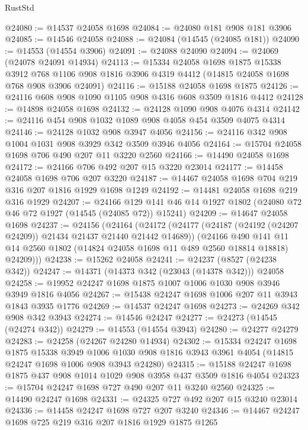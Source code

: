 \begin{lexlean}{RustStd}
\begin{coremodule}
@24080 := @14537 @24058 @1698
@24084 := @24080 @181 @908 @181 @3906
@24085 := @14546 @24058
@24088 := @24084 (@14545 (@24085 @181))
@24090 := @14553 (@14554 @3906)
@24091 := @24088 @24090
@24094 := @24069 (@24078 @24091 @14934)
@24113 := @15334
    @24058
    @1698
    @1875
    @15338
    @3912
    @768
    @1106
    @908
    @1816
    @3906
    @4319
    @4412
    (@14815 @24058 @1698 @768 @908 @3906 @24091)
@24116 := @15188 @24058 @1698 @1875
@24126 := @24116 @608 @908 @1090 @1105 @908 @4316 @608 @3509 @1816 @4412
@24128 := @14898 @24058 @1698
@24132 := @24128 @1090 @908 @4076 @4314
@24142 := @24116 @454 @908 @1032 @1089 @908 @4058 @454 @3509 @4075 @4314
@24146 := @24128 @1032 @908 @3947 @4056
@24156 := @24116 @342 @908 @1004 @1031 @908 @3929 @342 @3509 @3946 @4056
@24164 := @15704 @24058 @1698 @706 @490 @207 @11 @3220 @2560
@24166 := @14490 @24058 @1698
@24172 := @24166 @706 @492 @207 @15 @3220 @23014
@24177 := @14458 @24058 @1698 @706 @207 @3220
@24187 := @14467 @24058 @1698 @704 @219 @316 @207 @1816 @1929 @1698 @1249
@24192 := @14481 @24058 @1698 @219 @316 @1929
@24207 := @24166
    @129
    @141
    @46
    @14
    @1927
    @1802
    (@24080 @72 @46 @72 @1927 (@14545 (@24085 @72)) @15241)
@24209 := @14647 @24058 @1698
@24237 := @24156
    (@24164
      (@24172
        (@24177 (@24187 (@24192 (@24207 @24209)) @21434 @21437 @21440 @21442 @14689))
        (@24166
          @490
          @141
          @11
          @14
          @2560
          @1802
          (@14824 @24058 @1698 @11 @489 @2560 @18814 @18818)
          @24209)))
@24238 := @15262 @24058
@24241 := @24237 (@8527 (@24238 @342))
@24247 := @14371 (@14373 @342 (@23043 (@14378 @342))) @24058
@24258 := @19952 @24247 @1698 @1875 @1007 @1006 @1030 @908 @3946 @3949 @1816 @4056
@24267 := @15438 @24247 @1698 @1006 @207 @11 @3943 @1843 @3935 @1776
@24269 := @14537 @24247 @1698
@24273 := @24269 @342 @908 @342 @3943
@24274 := @14546 @24247
@24277 := @24273 (@14545 (@24274 @342))
@24279 := @14553 (@14554 @3943)
@24280 := @24277 @24279
@24283 := @24258 (@24267 @24280 @14934)
@24302 := @15334
    @24247
    @1698
    @1875
    @15338
    @3949
    @1006
    @1030
    @908
    @1816
    @3943
    @3961
    @4054
    (@14815 @24247 @1698 @1006 @908 @3943 @24280)
@24315 := @15188 @24247 @1698 @1875 @437 @908 @1014 @1029 @908 @3958 @437 @3509 @1816 @4054
@24323 := @15704 @24247 @1698 @727 @490 @207 @11 @3240 @2560
@24325 := @14490 @24247 @1698
@24331 := @24325 @727 @492 @207 @15 @3240 @23014
@24336 := @14458 @24247 @1698 @727 @207 @3240
@24346 := @14467 @24247 @1698 @725 @219 @316 @207 @1816 @1929 @1875 @1265

\end{coremodule}
\end{lexlean}
